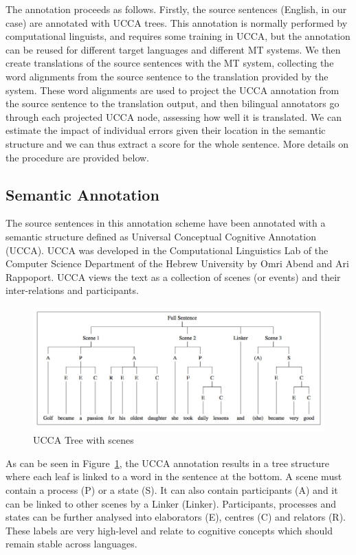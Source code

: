 \documentclass[11pt,letterpaper]{article}
\begin{document}
{The annotation proceeds as follows. Firstly, the source sentences (English, in our case) are annotated with UCCA trees. This
annotation is normally performed by computational linguists, and requires some training in UCCA, but the annotation can be 
reused for different target languages and different MT systems. 
We then create translations of the source sentences with the
MT system, collecting the word alignments from 
%
the
source sentence to 
the
translation provided by the system. These word
alignments are used to project the UCCA annotation from the source sentence to the translation output, and then bilingual
annotators go through each projected UCCA node, assessing how well it is translated.  
We can estimate the impact of individual errors given their location in the semantic structure 
and we can thus extract a score for the whole sentence. More details on the procedure are provided 
below.


\subsection{Semantic Annotation}

The source sentences in this annotation scheme have been annotated with  a semantic structure defined as
Universal Conceptual Cognitive Annotation (UCCA).  UCCA was developed in the Computational Linguistics Lab of the Computer Science Department of the Hebrew University by Omri Abend and Ari Rappoport.
UCCA views the text as a collection of scenes (or events)
and their inter-relations and participants. 

\begin{figure}[t]
    \includegraphics[width=1\textwidth]{ucca-tree.jpg}
    \caption{UCCA Tree with scenes}
    \label{ucca-tree}
\end{figure}

As can be seen
in Figure~\ref{ucca-tree}, the UCCA annotation results in a tree structure where each leaf is linked to
a word in the sentence at the bottom. A scene must contain a process (P) or a state (S). It can also contain
participants (A) and it can be linked to other scenes by a Linker (Linker). Participants, processes and states can be
further analysed into elaborators (E), centres (C) and relators (R). These labels are very 
high-level 
and relate to
cognitive concepts which should remain stable across languages.  

}
\end{document}
